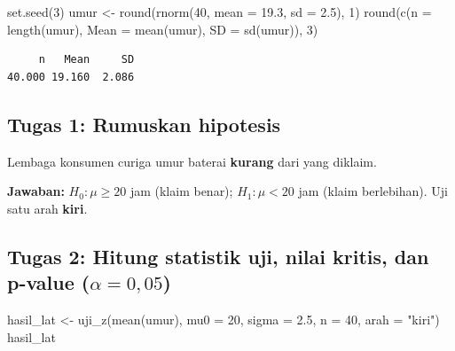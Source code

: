 \documentclass[
  indonesian,
  letterpaper,
]{book}
\newenvironment{Shaded}{\begin{snugshade}}{\end{snugshade}}
\newcommand{\AttributeTok}[1]{\textcolor[rgb]{0.40,0.45,0.13}{#1}}
\newcommand{\DecValTok}[1]{\textcolor[rgb]{0.68,0.00,0.00}{#1}}
\newcommand{\FloatTok}[1]{\textcolor[rgb]{0.68,0.00,0.00}{#1}}
\newcommand{\FunctionTok}[1]{\textcolor[rgb]{0.28,0.35,0.67}{#1}}
\newcommand{\NormalTok}[1]{\textcolor[rgb]{0.00,0.23,0.31}{#1}}
\newcommand{\OtherTok}[1]{\textcolor[rgb]{0.00,0.23,0.31}{#1}}
\newcommand{\StringTok}[1]{\textcolor[rgb]{0.13,0.47,0.30}{#1}}
\begin{document}
\begin{Shaded}
\begin{Highlighting}[]
\FunctionTok{set.seed}\NormalTok{(}\DecValTok{3}\NormalTok{)}
\NormalTok{umur }\OtherTok{\textless{}{-}} \FunctionTok{round}\NormalTok{(}\FunctionTok{rnorm}\NormalTok{(}\DecValTok{40}\NormalTok{, }\AttributeTok{mean =} \FloatTok{19.3}\NormalTok{, }\AttributeTok{sd =} \FloatTok{2.5}\NormalTok{), }\DecValTok{1}\NormalTok{)}
\FunctionTok{round}\NormalTok{(}\FunctionTok{c}\NormalTok{(}\AttributeTok{n =} \FunctionTok{length}\NormalTok{(umur), }\AttributeTok{Mean =} \FunctionTok{mean}\NormalTok{(umur), }\AttributeTok{SD =} \FunctionTok{sd}\NormalTok{(umur)), }\DecValTok{3}\NormalTok{)}
\end{Highlighting}
\end{Shaded}

\begin{verbatim}
     n   Mean     SD 
40.000 19.160  2.086 
\end{verbatim}

\subsection{Tugas 1: Rumuskan
hipotesis}\label{tugas-1-rumuskan-hipotesis}

Lembaga konsumen curiga umur baterai \textbf{kurang} dari yang diklaim.

\textbf{Jawaban:} \(H_0: \mu \ge 20\) jam (klaim benar);
\(H_1: \mu < 20\) jam (klaim berlebihan). Uji satu arah \textbf{kiri}.

\subsection{\texorpdfstring{Tugas 2: Hitung statistik uji, nilai kritis,
dan p-value
(\(\alpha = 0{,}05\))}{Tugas 2: Hitung statistik uji, nilai kritis, dan p-value (\textbackslash alpha = 0\{,\}05)}}\label{tugas-2-hitung-statistik-uji-nilai-kritis-dan-p-value-alpha-005}

\begin{Shaded}
\begin{Highlighting}[]
\NormalTok{hasil\_lat }\OtherTok{\textless{}{-}} \FunctionTok{uji\_z}\NormalTok{(}\FunctionTok{mean}\NormalTok{(umur), }\AttributeTok{mu0 =} \DecValTok{20}\NormalTok{, }\AttributeTok{sigma =} \FloatTok{2.5}\NormalTok{, }\AttributeTok{n =} \DecValTok{40}\NormalTok{, }\AttributeTok{arah =} \StringTok{"kiri"}\NormalTok{)}
\NormalTok{hasil\_lat}
\end{Highlighting}
\end{Shaded}
\end{document}
